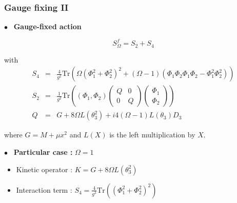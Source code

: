 \documentclass[9pt]{beamer}
\begin{document}
\begin{frame}

\frametitle{Gauge fixing II}

\vfill

$\bullet$ \ \textbf{Gauge-fixed action}

\begin{equation*}
S^f_\Omega=S_2+S_4
\end{equation*}

with
\vspace*{-2pt}
\begin{eqnarray*}
S_4 &=& \frac{4}{g^2} \mbox{Tr} \left( \Omega (\Phi_1^2 + \Phi_2^2)^2 + (\Omega-1)(\Phi_1\Phi_2\Phi_1\Phi_2 - \Phi_1^2\Phi_2^2) \right) \\
S_2 &=& \frac{1}{g^2} \mbox{Tr} \left((\Phi_1,\Phi_2)
\begin{pmatrix}
Q&0\\
0&Q
\end{pmatrix} 
\begin{pmatrix}
\Phi_1\\
\Phi_2
\end{pmatrix} 
\right) \\[2pt]
Q &=& G+8\Omega L(\theta_3^2) + i4 (\Omega-1) L(\theta_3) D_3 
\end{eqnarray*}

where $G=M+\mu x^2$ and $L(X)$ is the left multiplication by $X$.\\[4pt]

\vfill

$\bullet$ \ \textbf{Particular case :} $\Omega=1$

\begin{itemize}
\item Kinetic operator : $K = G+8\Omega L(\theta_3^2)$ 
\item Interaction term : $S_4 = \frac{4}{g^2} \mbox{Tr} \left( \left(\Phi_1^2 + \Phi_2^2\right)^2\right)$
\end{itemize}
\end{frame}

\end{document}
